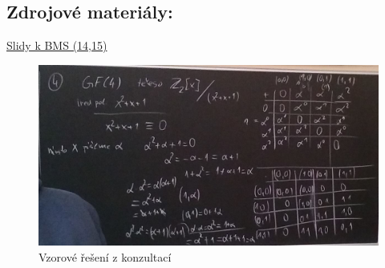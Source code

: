 \documentclass[10pt,a4paper]{article}
\begin{document}
\subsection*{Zdrojové materiály:}
\href{https://www.fit.vutbr.cz/study/courses/BMS/private/bms0x6_dvb.pdf}{Slidy k BMS (14,15)}

\begin{figure}[h!]
	\includegraphics[width=\linewidth]{reseni}
	\caption{Vzorové řešení z konzultací}
	\label{graph:gprof}
\end{figure}
\FloatBarrier
\end{document}
